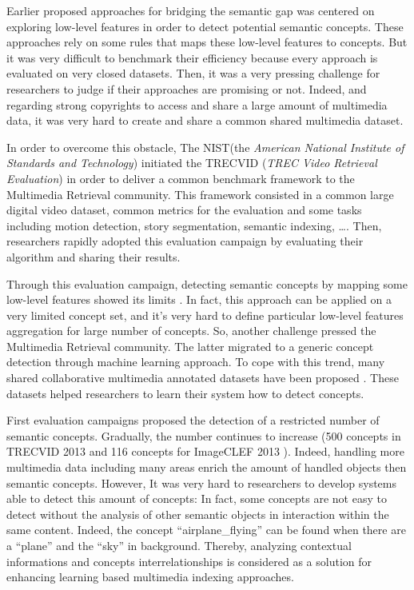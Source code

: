 	Earlier proposed approaches for bridging the semantic gap was centered on exploring low-level features in order to detect potential semantic concepts. These approaches rely on some rules that maps these low-level features to concepts. But it was very difficult to benchmark their efficiency because every approach is evaluated on very closed datasets. Then, it was a very pressing challenge for researchers to judge if their approaches are promising or not. Indeed, and regarding strong copyrights to access and share a large amount of multimedia data, it was very hard to create and share a common shared multimedia dataset.
	
	In order to overcome this obstacle, The NIST(the \textit{American National Institute of Standards and Technology}) initiated the TRECVID \cite{phd::Smeaton2001,phd::Oomen2013}(\textit{TREC Video Retrieval Evaluation}) in order to deliver a common benchmark framework to the Multimedia Retrieval community. This framework consisted in a common large digital video dataset, common metrics for the evaluation and some tasks including motion detection, story segmentation, semantic indexing, \dots. Then, researchers rapidly adopted this evaluation campaign by evaluating their algorithm and sharing their results.
	
	Through this evaluation campaign, detecting semantic concepts by mapping some low-level features showed its limits \cite{Snoek2006}. In fact, this approach can be applied on a very limited concept set, and it's very hard to define particular low-level features aggregation for large number of concepts. So, another challenge pressed the Multimedia Retrieval community. The latter migrated to a generic concept detection through machine learning approach. To cope with this trend, many shared collaborative multimedia annotated datasets have been proposed \cite{phd::Lin2003, phd::Volkmer2005a, phd::Ayache2007a, phd::Huiskes2008, Thomee2012}. These datasets helped researchers to learn their system how to detect concepts.
	
	First evaluation campaigns proposed the detection of a restricted number of semantic concepts. Gradually, the number continues to increase (500 concepts in TRECVID 2013 and 116 concepts for ImageCLEF 2013 \cite{phd::Villegas2012}). Indeed, handling more multimedia data including many areas enrich the amount of handled objects then semantic concepts. However, It was very hard to researchers to develop systems able to detect this amount of concepts: In fact, some concepts are not easy to detect without the analysis of other semantic objects in interaction within the same content. Indeed, the concept “airplane\_{}flying” can be found when there are a “plane” and the “sky” in background. 	Thereby, analyzing contextual informations and concepts interrelationships is considered as a solution for enhancing learning based multimedia indexing approaches. 
	

